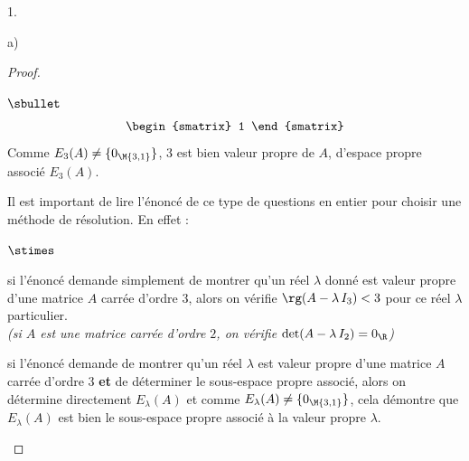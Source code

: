 \begin{noliste}{1.}
\begin{noliste}{a)}
\begin{proof}
\begin{noliste}{$\sbullet$}
\[\begin{array}{rcl}
{\begin{smatrix}
              1
            \end{smatrix}
          }
        \end{array}
        \]   
        Comme $E_3(A) \neq \{0_{\M{3,1}}\}$, $3$ est bien valeur
        propre de $A$, d'espace propre associé $E_3(A)$.%
        \begin{remarkL}{.97}%
          Il est important de lire l'énoncé de ce type de questions en
          entier pour choisir une méthode de résolution. En effet :
          \begin{noliste}{$\stimes$}
          \item si l'énoncé demande simplement de montrer qu'un réel
            $\lambda$ donné est valeur propre d'une matrice $A$ carrée
            d'ordre $3$, alors on vérifie $\rg(A-\lambda \, I_3) < 3$
            pour ce réel $\lambda$ particulier.\\
            {\it (si $A$ est une matrice carrée d'ordre $2$, on
              vérifie $\det(A-\lambda \, I_2)=0_{\R}$)}
          \item si l'énoncé demande de montrer qu'un réel $\lambda$
            est valeur propre d'une matrice $A$ carrée d'ordre $3$
            {\bf et} de déterminer le sous-espace propre associé,
            alors on détermine directement $E_\lambda(A)$ et comme
            $E_\lambda(A) \neq \{0_{\M{3,1}}\}$, cela démontre que
            $E_\lambda(A)$ est bien le sous-espace propre associé à la
            valeur propre $\lambda$.
          \end{noliste}
        \end{remarkL}


        \newpage



\end{noliste}
\end{proof}
\end{noliste}
\end{noliste}
